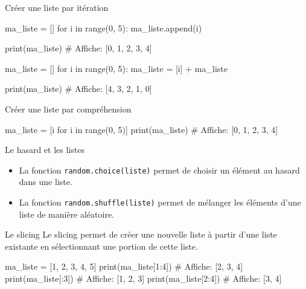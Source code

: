 \begin{easybox}{Créer une liste par itération}{}

\begin{minipage}{0.48\linewidth}
		\begin{CodePythontexAlt}[Largeur=1\linewidth,Centre,PremLigne=1]{}
ma_liste = []
for i in range(0, 5):
	ma_liste.append(i)

print(ma_liste)		
# Affiche: [0, 1, 2, 3, 4]
		\end{CodePythontexAlt}
	\end{minipage}\hfill
	\begin{minipage}{0.48\linewidth}
		\begin{CodePythontexAlt}[Largeur=1\linewidth,Centre,PremLigne=1]{}
ma_liste = []
for i in range(0, 5):
	ma_liste = [i] + ma_liste

print(ma_liste)
# Affiche: [4, 3, 2, 1, 0]
		
		\end{CodePythontexAlt}
	\end{minipage}
\end{easybox}

\begin{easybox}{Créer une liste par compréhension}{}

	\begin{CodePythontexAlt}[Largeur=1\linewidth,Centre,PremLigne=1]{}
ma_liste = [i for i in range(0, 5)]
print(ma_liste)
# Affiche: [0, 1, 2, 3, 4]
		\end{CodePythontexAlt}
		\end{easybox}


	
\begin{easybox}{Le hasard et les listes}{}
	\begin{itemize}
		\item La fonction \verb|random.choice(liste)| permet de choisir un élément au hasard dans une liste.
		\item La fonction \verb|random.shuffle(liste)| permet de mélanger les éléments d'une liste de manière aléatoire.
	\end{itemize}
\end{easybox}

\begin{easybox}{Le slicing}{}
	Le slicing permet de créer une nouvelle liste à partir d'une liste existante en sélectionnant une portion de cette liste.

	\begin{CodePythontexAlt}[Largeur=1\linewidth,Centre,PremLigne=1]{}
ma_liste = [1, 2, 3, 4, 5]
print(ma_liste[1:4])	# Affiche: [2, 3, 4]
print(ma_liste[:3])		# Affiche: [1, 2, 3]
print(ma_liste[2:4])	# Affiche: [3, 4]
		\end{CodePythontexAlt}
\end{easybox}

